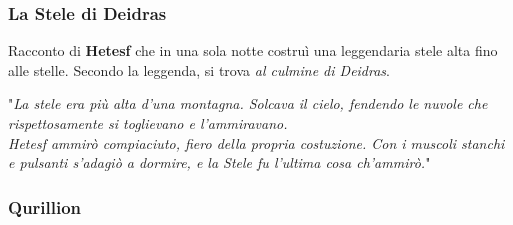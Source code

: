 \documentclass[10pt,twoside,onecolumn,openany]{book}
\begin{document}
\subsubsection{La Stele di Deidras} Racconto di \textbf{Hetesf} che in una sola notte costruì una leggendaria stele alta fino alle stelle. Secondo la leggenda, si trova \textit{al culmine di Deidras}.
\begin{quotebox}
"\textit{La stele era più alta d'una montagna. Solcava il cielo, fendendo le nuvole che rispettosamente si toglievano e l'ammiravano.\\
Hetesf ammirò compiaciuto, fiero della propria costuzione. Con i muscoli stanchi e pulsanti s'adagiò a dormire, e la Stele fu l'ultima cosa ch'ammirò.}"
\end{quotebox}
\subsubsection{Qurillion}
\end{document}
